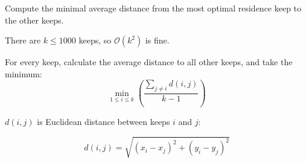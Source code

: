 \begin{frame}
    \frametitle{\problemtitle}
    \begin{description}
        \item<+->[Problem:] Compute the minimal average distance from the most optimal residence keep to the other keeps.
        \item<+->[Observation:] There are $k \leq 1000$ keeps, so $\mathcal O(k^2)$ is fine.
        \item<+->[Solution:] For every keep, calculate the average distance to all other keeps, and take the minimum:
            \[ \min_{1 \leq i \leq k}\left(
                \frac{\sum_{j \neq i} d(i, j)}{k - 1}
            \right) \]
            \vspace{0.5em}
            \begin{center}
                $d(i, j)$ is Euclidean distance between keeps $i$ and $j$:
            \end{center}
            \[ d(i, j) = \sqrt{(x_i - x_j)^2 + (y_i - y_j)^2} \]
    \end{description}
    \solvestats
\end{frame}
